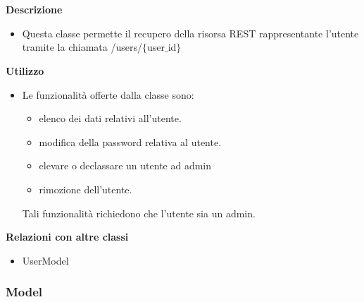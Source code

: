         \textbf{\\ \\ Descrizione} 
          \begin{itemize}
            \item[] Questa classe permette il recupero della risorsa REST rappresentante l'utente tramite la chiamata /users/$\{$user$\_$id$\}$
          \end{itemize}      
        \textbf{Utilizzo}  
          \begin{itemize}
            \item[] Le funzionalità offerte dalla classe sono: 
\begin{itemize} 
\item elenco dei dati relativi all'utente. 
\item modifica della password relativa al utente.
\item elevare o declassare un utente ad admin 
\item rimozione dell'utente.
\end{itemize}
Tali funzionalità richiedono che l'utente sia un admin.
          \end{itemize}
          \textbf{Relazioni con altre classi}
          \begin{itemize}
              \item{UserModel}
          \end{itemize}
  \subsubsection{Model}
